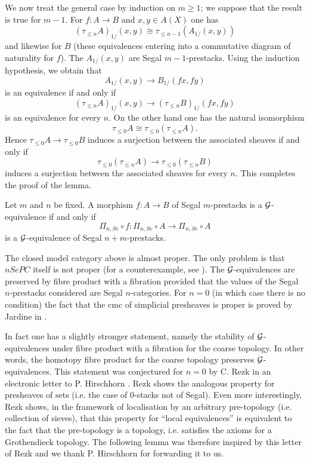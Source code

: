 We now treat the general case by induction on $m\geq 1$; we
suppose
that the result is true for $m-1$.
For $f: A\rightarrow B$ and $x,y\in A(X)$ one has
$$
(\tau _{\leq n}A)_{1/}(x,y) \cong \tau _{\leq n-1}(A_{1/}(x,y))
$$
and likewise for $B$ (these equivalences entering into a commutative
diagram of naturality for $f$). The $A_{1/}(x,y)$ are
Segal $m-1$-prestacks. Using the induction
hypothesis, we obtain
that
$$
A_{1/}(x,y)\rightarrow B_{1/}(fx,fy)
$$
is an equivalence if and only if
$$
(\tau _{\leq n}A)_{1/}(x,y)\rightarrow (\tau _{\leq n}B)_{1/}(fx,fy)
$$
is an equivalence for every $n$.
On the other hand one has the natural isomorphism
$$
\tau _{\leq 0}A \cong \tau _{\leq 0}(\tau _{\leq n}A).
$$
Hence $\tau _{\leq 0}A\rightarrow \tau _{\leq 0}B$ induces a
surjection between the
associated sheaves if and only if
$$
\tau _{\leq 0}(\tau _{\leq n}A)\rightarrow \tau _{\leq 0}(\tau _{\leq n}B)
$$
induces a surjection between the associated sheaves for every $n$.
This completes the proof of the lemma.
\eop

\begin{corollary}
\label{compPin}
Let $m$ and $n$ be fixed. A morphism $f: A\rightarrow B$ of
Segal $m$-prestacks is
a ${\cal G}$-equivalence if and only if
$$
\Pi _{n,Se}\circ f: \Pi _{n,Se}\circ A\rightarrow \Pi _{n,Se}\circ A
$$
is a ${\cal G}$-equivalence of Segal $n+m$-prestacks.
\end{corollary}
\eop


The closed model category above is almost proper. The only
problem is that $nSePC$ itself is not proper (for a counterexample,
see \cite{nCAT}). The ${\cal G}$-equivalences
are preserved
by fibre product with a fibration provided that the values
of the Segal $n$-prestacks considered are Segal
$n$-categories.
For $n=0$ (in which case there is no condition) the fact that the cmc of
simplicial presheaves is proper is proved by Jardine in
\cite{JardineBool}.

In fact one has a slightly stronger statement, namely the stability of
${\cal G}$-equivalences under fibre product with a fibration for the coarse
topology. In other words, the homotopy fibre product for the coarse
topology preserves ${\cal G}$-equivalences. This statement was
conjectured for $n=0$ by C. Rezk in
an electronic letter to P. Hirschhorn \cite{Rezk}. Rezk
shows the analogous property
for presheaves of sets (i.e. the case of
$0$-stacks not of Segal). Even more interestingly, Rezk shows, in the framework
of localisation by an arbitrary pre-topology (i.e. collection of sieves),
that this property for ``local equivalences'' is
equivalent to the fact that the pre-topology is a topology, i.e.
satisfies the
axioms for a Grothendieck topology. The following lemma was therefore
inspired by this letter of Rezk and we thank P. Hirschhorn for
forwarding it to us.

